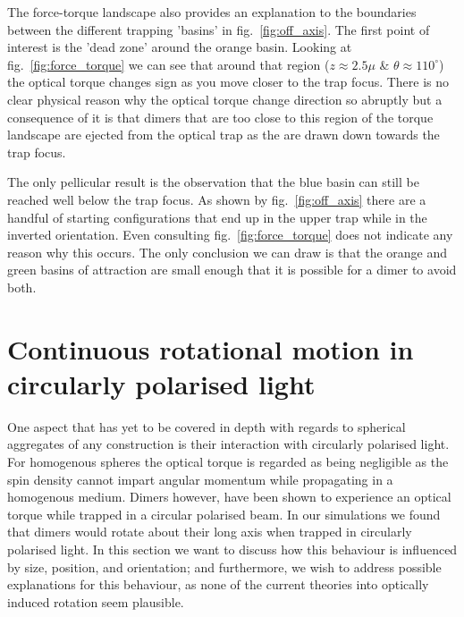 The force-torque landscape also provides an explanation
to the boundaries between the different trapping 'basins'
in fig.~\ref{fig:off_axis}. The first point of interest 
is the 'dead zone' around the orange basin. Looking at 
fig.~\ref{fig:force_torque} we can see that around that
region ($z \approx 2.5\mu$ \& $\theta\approx 110^\circ$)
the optical torque changes sign as you move closer to 
the trap focus. There is no clear physical reason why
the optical torque change direction so abruptly but a 
consequence of it is that dimers that are too close to 
this region of the torque landscape are ejected from 
the optical trap as the are drawn down towards the trap
focus.

The only pellicular result is the observation that the 
blue basin can still be reached well below the trap 
focus. As shown by fig.~\ref{fig:off_axis} there are a 
handful of starting configurations that end up in the 
upper trap while in the inverted orientation. Even 
consulting fig.~\ref{fig:force_torque} does not indicate
any reason why this occurs. The only conclusion we can 
draw is that the orange and green basins of attraction 
are small enough that it is possible for a dimer to 
avoid both. 
\section{Continuous rotational motion in circularly polarised light}
One aspect that has yet to be covered in depth with regards 
to spherical aggregates of any construction is their interaction 
with circularly polarised light. For homogenous spheres the 
optical torque is regarded as being negligible as the spin 
density cannot impart angular momentum while propagating in a 
homogenous medium. Dimers however, have been shown to experience 
an optical torque \cite{Vigilante2020, Ahn2018, Reimann2018} 
while trapped in a circular polarised beam. In our simulations 
we found that dimers would rotate about their long axis when 
trapped in circularly polarised light. In this section we want 
to discuss how this behaviour is influenced by size, position, 
and orientation; and furthermore, we wish to address possible 
explanations for this behaviour, as none of the current
theories into optically induced rotation seem plausible.

